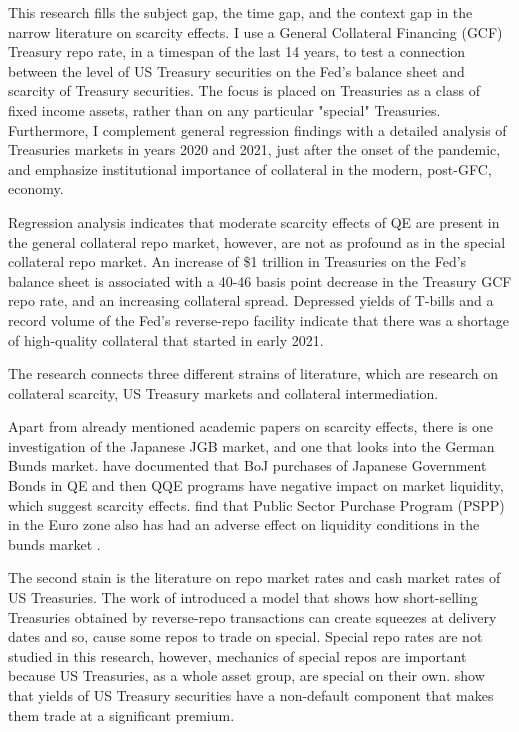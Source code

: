 \documentclass[11pt,a4paper,english,oneside]{article}
\begin{document}
This research fills the subject gap, the time gap, and the context gap in the narrow literature on scarcity effects. I use a General Collateral Financing (GCF) Treasury repo rate, in a timespan of the last 14 years, to test a connection between the level of US Treasury securities on the Fed's balance sheet and scarcity of Treasury securities. The focus is placed on Treasuries as a class of fixed income assets, rather than on any particular "special" Treasuries. Furthermore, I complement general regression findings with a detailed analysis of Treasuries markets in years 2020 and 2021, just after the onset of the pandemic, and emphasize institutional importance of collateral in the modern, post-GFC, economy.

Regression analysis indicates that moderate scarcity effects of QE are present in the general collateral repo market, however, are not as profound as in the special collateral repo market. An increase of \$1 trillion in Treasuries on the Fed's balance sheet is associated with a 40-46 basis point decrease in the Treasury GCF repo rate, and an increasing collateral spread. Depressed yields of T-bills and a record volume of the Fed's reverse-repo facility indicate that there was a shortage of high-quality collateral that started in early 2021.

The research connects three different strains of literature, which are research on collateral scarcity, US Treasury markets and collateral intermediation.

Apart from already mentioned academic papers on scarcity effects, there is one investigation of the Japanese JGB market, and one that looks into the German Bunds market. \citet{han2018} have documented that BoJ purchases of Japanese Government Bonds in QE and then QQE programs have negative impact on market liquidity, which suggest scarcity effects. \citet{schlepper2017} find that Public Sector Purchase Program (PSPP) in the Euro zone also has had an adverse effect on liquidity conditions in the bunds market .

The second stain is the literature on repo market rates and cash market rates of US Treasuries. The work of \citet{duffie1996} introduced a model that shows how short-selling Treasuries obtained by reverse-repo transactions can create squeezes at delivery dates and so, cause some repos to trade on special. Special repo rates are not studied in this research, however, mechanics of special repos are important because US Treasuries, as a whole asset group, are special on their own. \citet{krishnamurthy2012} show that yields of US Treasury securities have a non-default component that makes them trade at a significant premium. 
\end{document}
